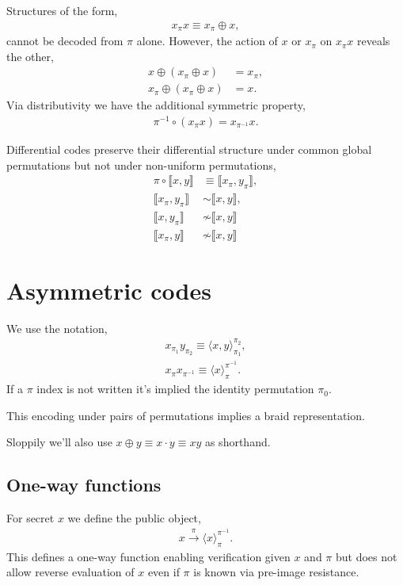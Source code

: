 \documentclass[twocolumn, aps, amsmath, amssymb, nofootinbib, superscriptaddress, longbibliography, doublefloatfix, table-of-contents, eqsecnum, rmp]{revtex4-2}
\def\diff#1#2{\llbracket #1,#2\rrbracket}
\def\braid#1#2#3#4{\langle#1,#2\rangle_{#3}^{#4}}
\def\selfbraid#1#2#3{\langle#1\rangle_{#2}^{#3}}
\begin{document}
Structures of the form,
\begin{align}
	x_\pi x \equiv x_\pi \oplus x,
\end{align}
cannot be decoded from $\pi$ alone. However, the action of $x$ or $x_\pi$ on $x_\pi x$ reveals the other,
\begin{align}
	x \oplus (x_\pi \oplus x) & = x_\pi,\nonumber\\
	x_\pi \oplus (x_\pi \oplus x) &= x.
\end{align}
Via distributivity we have the additional symmetric property,
\begin{align}
	\pi^{-1} \circ (x_\pi x)	 = x_{\pi^{-1}} x.
\end{align}

Differential codes preserve their differential structure under common global permutations but not under non-uniform permutations,
\begin{align}
	\pi\circ \diff{x}{y}	 &\equiv \diff{x_\pi}{y_\pi},\nonumber\\
 	\diff{x_\pi}{y_\pi} &\sim \diff{x}{y},\nonumber\\
	\diff{x}{y_\pi} &\not\sim \diff{x}{y} \nonumber\\
	\diff{x_\pi}{y} &\not\sim \diff{x}{y}
\end{align}

\section{Asymmetric codes}

We use the notation,
\begin{align}
	x_{\pi_1} y_{\pi_2} \equiv \braid{x}{y}{\pi_1}{\pi_2},\nonumber\\
	x_{\pi} x_{\pi^{-1}} \equiv \selfbraid{x}{\pi}{\pi^{-1}}.
\end{align}
If a $\pi$ index is not written it's implied the identity permutation $\pi_0$.

This encoding under pairs of permutations implies a braid representation.

Sloppily we'll also use $x\oplus y \equiv x \cdot y \equiv xy$ as shorthand.

\subsection{One-way functions}

For secret $x$ we define the public object,
\begin{align} \label{eq:one_way_sum}
	x \xrightarrow{\pi} \selfbraid{x}{\pi}{\pi^{-1}}.
\end{align}
This defines a one-way function enabling verification given $x$ and $\pi$ but does not allow reverse evaluation of $x$ even if $\pi$ is known via pre-image resistance.
\end{document}
